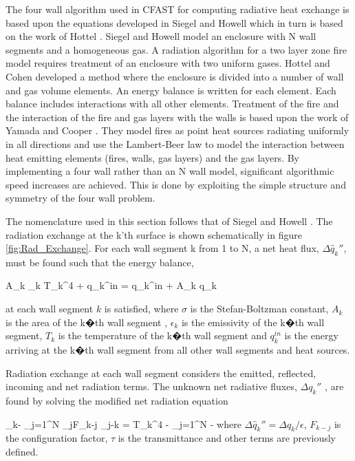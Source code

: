 The four wall algorithm used in CFAST for computing radiative heat exchange is based upon the equations developed in Siegel and Howell \cite{SiegelandHowell:1981} which in turn is based on the work of Hottel \cite{Hottel:1954}. Siegel and Howell model an enclosure with N wall segments and a homogeneous gas. A radiation algorithm for a two layer zone fire model requires treatment of an enclosure with two uniform gases.  Hottel and Cohen \cite{Hottel:1958} developed a method where the enclosure is divided into a number of wall and gas volume elements. An energy balance is written for each element. Each balance includes interactions with all other elements.  Treatment of the fire and the interaction of the fire and gas layers with the walls is based upon the work of Yamada and Cooper \cite{Yamada:1990}.  They model fires as point heat sources radiating uniformly in all directions and use the Lambert-Beer law to model the interaction between heat emitting elements (fires, walls, gas layers) and the gas layers. By implementing a four wall rather than an N wall model, significant algorithmic speed increases are achieved.  This is done by exploiting the simple structure and symmetry of the four wall problem.

The nomenclature used in this section follows that of Siegel and Howell \cite{SiegelandHowell:1981}.  The radiation exchange at the k'th surface is shown schematically in figure \ref{fig:Rad_Exchange}.  For each wall segment k from 1 to N, a net heat flux, $\Delta \hat{q}_k\dprime$, must be found such that the energy balance,

\be \sigma A_k \epsilon_k T_k^4 + q_k^{in} = q_k^{in} + A_k \Delta q_k\dprime \ee

at each wall segment $k$ is satisfied, where $\sigma$ is the Stefan-Boltzman constant, $A_k$ is the area of the k�th wall segment , $\epsilon_k$ is the emissivity of the k�th wall segment, $T_k$ is the temperature of the k�th wall segment and $q_k^{in}$ is the energy arriving at the k�th wall segment from all other wall segments and heat sources.

Radiation exchange at each wall segment considers the emitted, reflected, incoming and net radiation terms.  The unknown net radiative fluxes, $\Delta q_k\dprime$ , are found by solving the modified net radiation equation

\be \Delta {}_k\dprime - \displaystyle\sum_{j=1}^N  \Delta {}_j\dprime F_{k-j} \tau_{j-k} = \sigma T_k^4 - \displaystyle\sum_{j=1}^N  -  \ee
where $\Delta \hat{q}_k\dprime = \Delta q_k / \epsilon$, $F_{k-j}$ is the configuration factor, $\tau$ is the transmittance and other terms are previously defined.

